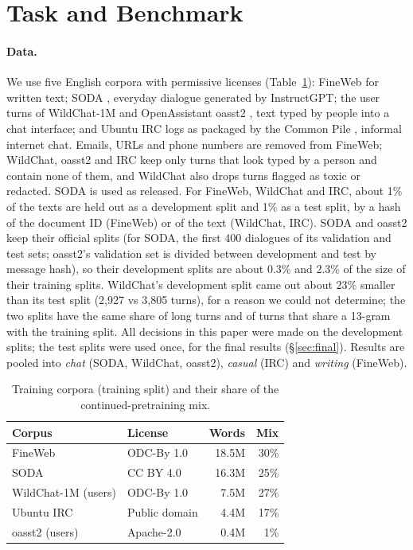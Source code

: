 \documentclass[11pt]{article}
\begin{document}
\section{Task and Benchmark}
\label{sec:benchmark}

\paragraph{Data.} We use five English corpora with permissive licenses (Table~\ref{tab:data}): FineWeb
\citep{penedo-etal-2024-fineweb} for written text; SODA \citep{kim-etal-2023-soda}, everyday dialogue generated by
InstructGPT; the user turns of WildChat-1M \citep{zhao-etal-2024-wildchat} and OpenAssistant oasst2
\citep{kopf-etal-2023-openassistant}, text typed by people into a chat interface; and Ubuntu IRC logs as packaged by
the Common Pile \citep{kandpal-etal-2025-common}, informal internet chat. Emails, URLs and phone numbers are removed
from FineWeb; WildChat, oasst2 and IRC keep only turns that look typed by a person and contain none of them, and
WildChat also drops turns flagged as toxic or redacted. SODA is used as released. For FineWeb, WildChat and IRC, about
1\% of the texts are held out as a development split and 1\% as a test split, by a hash of the document ID (FineWeb)
or of the text (WildChat, IRC). SODA and oasst2 keep their official splits (for SODA, the first 400 dialogues of its
validation and test sets; oasst2's validation set is divided between development and test by message hash), so their
development splits are about 0.3\% and 2.3\% of the size of their training splits. WildChat's development split came out about 23\% smaller than its test split (2,927
vs 3,805 turns), for a reason we could not determine; the two splits have the same share of long turns and of turns
that share a 13-gram with the training split. All decisions in this paper were made on the
development splits; the test splits were used once, for the final results (\S\ref{sec:final}). Results are pooled
into \emph{chat} (SODA, WildChat, oasst2), \emph{casual} (IRC) and \emph{writing} (FineWeb).

\begin{table}[t]
\centering
\small
\begin{tabular}{@{}llrr@{}}
\toprule
Corpus & License & Words & Mix \\
\midrule
FineWeb & ODC-By 1.0 & 18.5M & 30\% \\
SODA & CC BY 4.0 & 16.3M & 25\% \\
WildChat-1M (users) & ODC-By 1.0 & 7.5M & 27\% \\
Ubuntu IRC & Public domain & 4.4M & 17\% \\
oasst2 (users) & Apache-2.0 & 0.4M & 1\% \\
\bottomrule
\end{tabular}
\caption{Training corpora (training split) and their share of the continued-pretraining mix.}
\label{tab:data}
\end{table}
\end{document}
